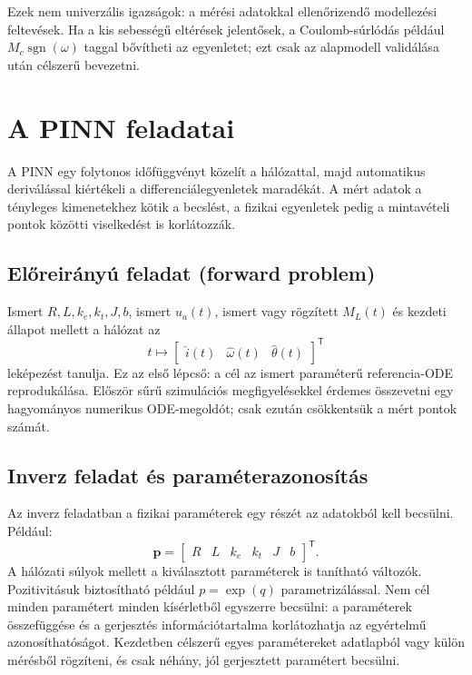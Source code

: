 \documentclass[11pt,a4paper]{article}
\newcommand{\vect}[1]{\boldsymbol{#1}}
\begin{document}
Ezek nem univerzális igazságok: a mérési adatokkal ellenőrizendő modellezési feltevések. Ha a kis sebességű eltérések jelentősek, a Coulomb-súrlódás például $M_c\operatorname{sgn}(\omega)$ taggal bővítheti az egyenletet; ezt csak az alapmodell validálása után célszerű bevezetni.

\section{A PINN feladatai}

A PINN egy folytonos időfüggvényt közelít a hálózattal, majd automatikus deriválással kiértékeli a differenciálegyenletek maradékát. A mért adatok a tényleges kimenetekhez kötik a becslést, a fizikai egyenletek pedig a mintavételi pontok közötti viselkedést is korlátozzák.

\subsection{Előreirányú feladat (forward problem)}

Ismert $R,L,k_e,k_t,J,b$, ismert $u_a(t)$, ismert vagy rögzített $M_L(t)$ és kezdeti állapot mellett a hálózat az
\[
  t \longmapsto
  \begin{bmatrix}\hat{i}(t)&\hat{\omega}(t)&\hat{\theta}(t)\end{bmatrix}^{\mathsf T}
\]
leképezést tanulja. Ez az első lépcső: a cél az ismert paraméterű referencia-ODE reprodukálása. Először sűrű szimulációs megfigyelésekkel érdemes összevetni egy hagyományos numerikus ODE-megoldót; csak ezután csökkentsük a mért pontok számát.

\subsection{Inverz feladat és paraméterazonosítás}

Az inverz feladatban a fizikai paraméterek egy részét az adatokból kell becsülni. Például:
\begin{equation}
  \vect{p}=
  \begin{bmatrix}R&L&k_e&k_t&J&b\end{bmatrix}^{\mathsf T}.
\end{equation}
A hálózati súlyok mellett a kiválasztott paraméterek is tanítható változók. Pozitivitásuk biztosítható például $p=\exp(q)$ parametrizálással. Nem cél minden paramétert minden kísérletből egyszerre becsülni: a paraméterek összefüggése és a gerjesztés információtartalma korlátozhatja az egyértelmű azonosíthatóságot. Kezdetben célszerű egyes paramétereket adatlapból vagy külön mérésből rögzíteni, és csak néhány, jól gerjesztett paramétert becsülni.
\end{document}
